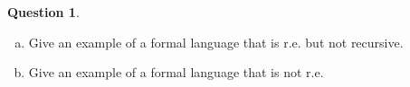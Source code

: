 \documentclass{article}
\theoremstyle{definition}
\newtheorem{Q}{Question}
\newcommand{\tvs}{\textvisiblespace}
\begin{document}
\begin{comment}
\draw (13.85,-14.5) node [below] {$:,\rightarrow$};
\draw [black] (20.2,-11) -- (20.2,-6.6);
\fill [black] (20.2,-6.6) -- (19.7,-7.4) -- (20.7,-7.4);
\draw (19.7,-8.8) node [left] {$\{\tvs,b\},\tvs$};
\draw [black] (23.2,-14) -- (28.8,-14);
\fill [black] (28.8,-14) -- (28,-13.5) -- (28,-14.5);
\draw (26,-14.5) node [below] {$a,\tvs$};
\draw [black] (34.8,-14) -- (40.7,-14);
\fill [black] (40.7,-14) -- (39.9,-13.5) -- (39.9,-14.5);
\draw (37.75,-14.5) node [below] {$\tvs,\rightarrow$};
\draw [black] (46.7,-14) -- (52.3,-14);
\fill [black] (52.3,-14) -- (51.5,-13.5) -- (51.5,-14.5);
\draw (49.5,-14.5) node [below] {$\tvs,\leftarrow$};
\draw [black] (23.197,-3.482) arc (90.62681:56.36446:52.499);
\fill [black] (23.2,-3.48) -- (24,-3.97) -- (23.99,-2.97);
\draw (43.54,-4.85) node [above] {$\{a,\tvs\},\tvs$};
\draw [black] (45.023,-16.68) arc (54:-234:2.25);
\draw (43.7,-21.25) node [below] {$\{a,b\},\rightarrow$};
\fill [black] (42.38,-16.68) -- (41.5,-17.03) -- (42.31,-17.62);
\draw [black] (58.3,-14) -- (65.4,-14);
\fill [black] (65.4,-14) -- (64.6,-13.5) -- (64.6,-14.5);
\draw (61.85,-13.5) node [above] {$b,\tvs$};
\draw [black] (68.4,-17) -- (68.4,-26.3);
\fill [black] (68.4,-26.3) -- (68.9,-25.5) -- (67.9,-25.5);
\draw (67.9,-21.65) node [left] {$\tvs,\leftarrow$};
\draw [black] (65.4,-29.3) -- (34.8,-29.3);
\fill [black] (34.8,-29.3) -- (35.6,-29.8) -- (35.6,-28.8);
\draw (50.1,-28.8) node [above] {$\tvs,\rightarrow$};
\draw [black] (69.723,-31.98) arc (54:-234:2.25);
\draw (68.4,-36.55) node [below] {$\{a,b\},\leftarrow$};
\fill [black] (67.08,-31.98) -- (66.2,-32.33) -- (67.01,-32.92);
\draw [black] (31.8,-26.3) -- (31.8,-17);
\fill [black] (31.8,-17) -- (31.3,-17.8) -- (32.3,-17.8);
\draw (31.3,-21.65) node [left] {$a,\tvs$};
\draw [black] (28.8,-29.3) -- (23.2,-29.3);
\fill [black] (23.2,-29.3) -- (24,-29.8) -- (24,-28.8);
\draw (26,-28.8) node [above] {$\tvs,\tvs$};
\end{tikzpicture}
\end{center}

\end{comment}

\begin{Q}
\mbox{}
\begin{enumerate}[a)]
\item Give an example of a formal language that is r.e. but not recursive.
\item Give an example of a formal language that is not r.e.
\end{enumerate}
\end{Q}
\begin{comment}
\textbf{Solution}
\begin{enumerate}[a)]
\item SA (see Definition \ref{D:SA}).
\item NSA (see Definition \ref{D:NSA}). 
\end{enumerate}
\end{comment}
\end{document}
